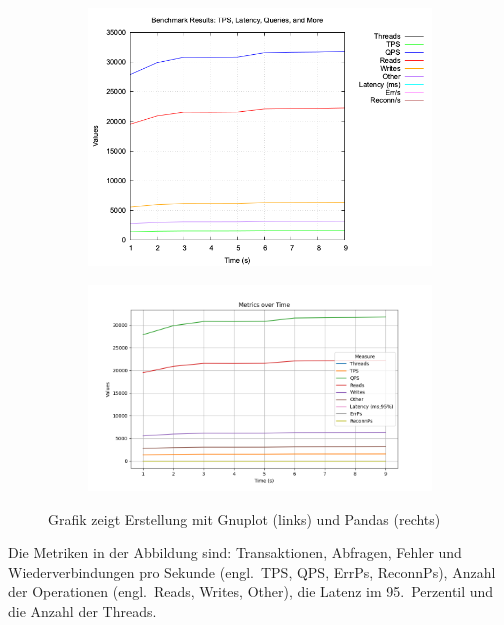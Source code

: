 \vspace{-5pt}
\begin{figure}[H]
    \centering
    \begin{subfigure}[t]{0.36\textwidth}
        \includegraphics[width=\textwidth]{PNGs/Demo/sysbench_output}
    \end{subfigure}
    \hfill
    \begin{subfigure}[t]{0.48\textwidth}
        \includegraphics[width=\textwidth]{PNGs/Demo/Summary}
    \end{subfigure}
    \caption[Demo: Gnuplot vs. Pandas]{Grafik zeigt Erstellung mit Gnuplot (links) und Pandas (rechts)}
    \label{fig:demo-graph-generation}
\end{figure}
\vspace{-15pt}

Die Metriken in der Abbildung sind: Transaktionen, Abfragen, Fehler und Wiederverbindungen pro Sekunde (engl.\ TPS, QPS, ErrPs, ReconnPs), Anzahl der Operationen (engl.\ Reads, Writes, Other), die Latenz im 95.\ Perzentil und die Anzahl der Threads.

